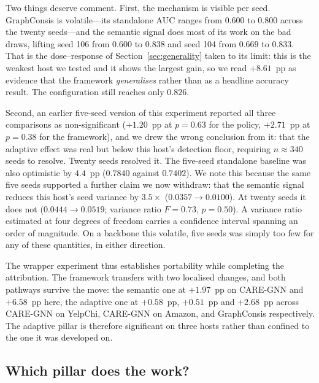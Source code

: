 \documentclass{conf}
\begin{document}
Two things deserve comment. First, the mechanism is visible per seed.
GraphConsis is volatile---its standalone AUC ranges from $0.600$ to $0.800$
across the twenty seeds---and the semantic signal does most of its work on the
bad draws, lifting seed 106 from $0.600$ to $0.838$ and seed 104 from $0.669$
to $0.833$. That is the dose--response of Section~\ref{sec:generality} taken to
its limit: this is the weakest host we tested and it shows the largest gain, so
we read $+8.61$~pp as evidence that the framework \emph{generalises} rather
than as a headline accuracy result. The configuration still reaches only
$0.826$.

Second, an earlier five-seed version of this experiment reported all three
comparisons as non-significant ($+1.20$~pp at $p=0.63$ for the policy,
$+2.71$~pp at $p=0.38$ for the framework), and we drew the wrong conclusion
from it: that the adaptive effect was real but below this host's detection
floor, requiring $n\!\approx\!340$ seeds to resolve. Twenty seeds resolved it.
The five-seed standalone baseline was also optimistic by $4.4$~pp
($0.7840$ against $0.7402$). We note this because the same five seeds supported
a further claim we now withdraw: that the semantic signal reduces this host's
seed variance by $3.5\times$ ($0.0357 \to 0.0100$). At twenty seeds it does not
($0.0444 \to 0.0519$; variance ratio $F=0.73$, $p=0.50$). A variance ratio
estimated at four degrees of freedom carries a confidence interval spanning an
order of magnitude. On a backbone this volatile, five seeds was simply too few
for any of these quantities, in either direction.

The wrapper experiment thus establishes portability while completing the
attribution. The framework transfers with two localised changes, and both
pathways survive the move: the semantic one at $+1.97$~pp on CARE-GNN and
$+6.58$~pp here, the adaptive one at $+0.58$~pp, $+0.51$~pp and $+2.68$~pp
across CARE-GNN on YelpChi, CARE-GNN on Amazon, and GraphConsis respectively.
The adaptive pillar is therefore significant on three hosts rather than
confined to the one it was developed on.
\subsection{Which pillar does the work?}
\label{sec:ablation}
\end{document}
